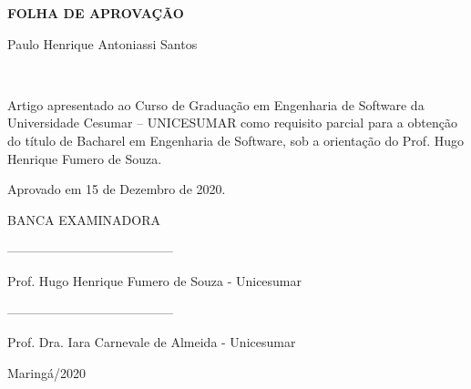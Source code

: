 \begin{center}
    \makeatletter
    \textbf{FOLHA DE APROVAÇÃO} \par
    Paulo Henrique Antoniassi Santos
    \par
    \vspace{1cm}
    \large
    \textbf{ \@title} \\
    \normalsize
    
    \vspace{1cm}
    
    Artigo apresentado ao Curso de Graduação em Engenharia de Software da Universidade Cesumar – UNICESUMAR como requisito parcial para a obtenção do título de Bacharel em Engenharia de Software, sob a orientação do Prof. Hugo Henrique Fumero de Souza.\par
    
    \vspace{0.5cm}

    Aprovado em 15 de Dezembro de 2020.
    
    \vspace{0.5cm}
    
\end{center}
\begin{flushleft}
    BANCA EXAMINADORA \par

    \vspace{1cm}
    --------------------------------------- \par
    Prof. Hugo Henrique Fumero de Souza - Unicesumar \par
    \vspace{1cm}
    --------------------------------------- \par
    Prof. Dra. Iara Carnevale de Almeida - Unicesumar \par
    \vspace{1cm}
\end{flushleft}

\begin{center}
    \vspace{3cm}
    Maringá/2020
\end{center}

\normalsize
\makeatother
\newpage

